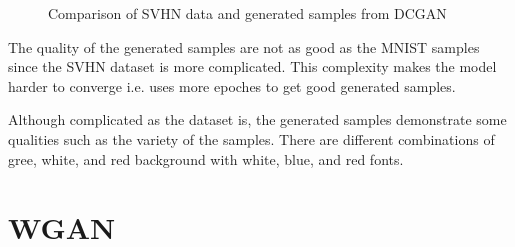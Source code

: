 \documentclass{article}
\begin{document}
\begin{figure}[!htb]
  \centering
  \caption{Comparison of SVHN data and generated samples from DCGAN}
  \label{fig:DCGAN_SVHN}
\end{figure}

The quality of the generated samples are not as good as the MNIST samples since the SVHN dataset is more complicated.
This complexity makes the model harder to converge i.e. uses more epoches to get good generated samples.

Although complicated as the dataset is, the generated samples demonstrate some qualities such as the variety of the samples. There are different combinations of gree, white, and red background with white, blue, and red fonts.

\section{WGAN}
\end{document}
